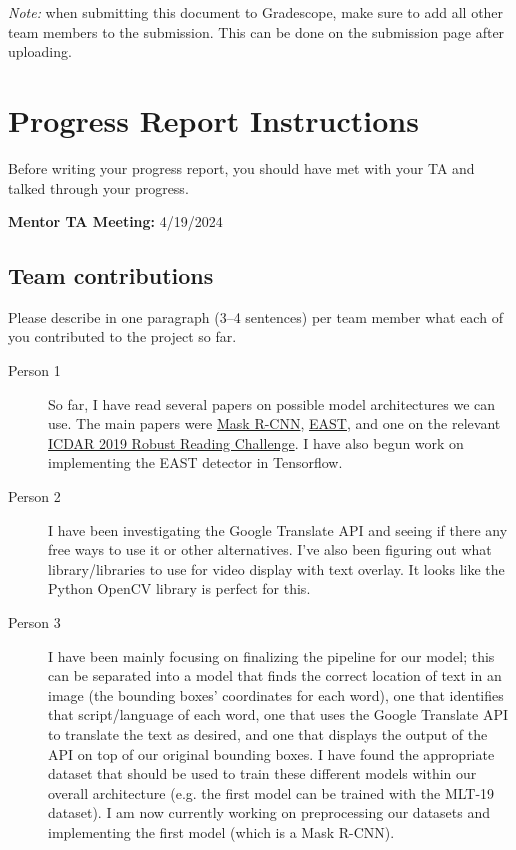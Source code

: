 \emph{Note:} when submitting this document to Gradescope, make sure to add all other team members to the submission. This can be done on the submission page after uploading.

\section*{Progress Report Instructions}

Before writing your progress report, you should have met with your TA and talked through your progress.

\textbf{Mentor TA Meeting:} 4/19/2024

\subsection*{Team contributions}

Please describe in one paragraph (3--4 sentences) per team member what each of you contributed to the project so far.
\begin{description}

\item[Person 1] So far, I have read several papers on possible model architectures we can use. The main papers were \href{http://arxiv.org/abs/2206.00311}{Mask R-CNN}, \href{https://arxiv.org/pdf/1704.03155.pdf}{EAST}, and one on the relevant \href{https://arxiv.org/pdf/1907.00945.pdf}{ICDAR 2019 Robust Reading Challenge}. I have also begun work on implementing the EAST detector in Tensorflow.

\item[Person 2] I have been investigating the Google Translate API and seeing if there any free ways to use it or other alternatives. I've also been figuring out what library/libraries to use for video display with text overlay. It looks like the Python OpenCV library is perfect for this.

\item [Person 3] I have been mainly focusing on finalizing the pipeline for our model; this can be separated into a model that finds the correct location of text in an image (the bounding boxes’ coordinates for each word), one that identifies that script/language of each word, one that uses the Google Translate API to translate the text as desired, and one that displays the output of the API on top of our original bounding boxes. I have found the appropriate dataset that should be used to train these different models within our overall architecture (e.g. the first model can be trained with the MLT-19 dataset). I am now currently working on preprocessing our datasets and implementing the first model (which is a Mask R-CNN).

\end{description}


